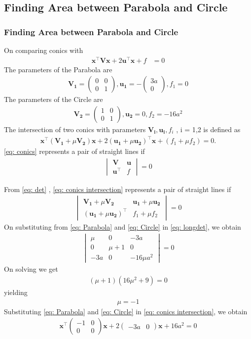 \documentclass{beamer}
\theoremstyle{remark}
\newcommand{\myvec}[1]{\ensuremath{\begin{pmatrix}#1\end{pmatrix}}}
\newcommand{\mydet}[1]{\ensuremath{\begin{vmatrix}#1\end{vmatrix}}}
\let\vec\mathbf
\numberwithin{equation}{section}
\begin{document}
\subsection{Finding Area between Parabola and Circle}
\begin{frame}
\frametitle{Finding Area between Parabola and Circle}
On comparing conics with 
\begin{align}
\vec{x}^\top\vec{V}\vec{x} + 2\vec{u}^\top\vec{x} + f &= 0 \label{eq: conics}
\end{align}
The parameters of the Parabola are 
\begin{align}
\vec{V_1}=\myvec{0&0\\0&1} , \vec{u_1}=-\myvec{3a\\0} , f_1=0 \label{eq: Parabola}
\end{align}
The parameters of the Circle are
\begin{align}
\vec{V_2}=\myvec{1&0\\0&1},\vec{u_2}=0,f_2=-16a^2  \label{eq: Circle}
\end{align}
The intersection of two conics with parameters $\vec{V_i},\vec{u_i},f_i$ , i = 1,2 is defined as
\begin{align}
\vec{x}^\top(\vec{V_1} + \mu\vec{V_2})\vec{x} + 2(\vec{u_1} + \mu\vec{u_2})^\top\vec{x} + (f_1 +\mu f_2) = 0. \label{eq: conics intersection}
\end{align}
\eqref{eq: conics} represents a pair of straight lines if 
\begin{align}
\mydet{\vec{V}&\vec{u}\\\vec{u}^\top&f} = 0  \label{eq: det}
\end{align}
\end{frame}
\begin{frame}
From \eqref{eq: det} , \eqref{eq: conics intersection} represents a pair of straight lines if
\begin{align}
\mydet{\vec{V_1} + \mu\vec{V_2}&\vec{u_1} + \mu\vec{u_2}\\
       (\vec{u_1} + \mu\vec{u_2})^\top&f_1 + \mu f_2} = 0  \label{eq: longdet}
\end{align}
On substituting from \eqref{eq: Parabola} and \eqref{eq: Circle} in \eqref{eq: longdet}, we obtain
\begin{align}
\mydet{\mu&0&-3a\\
       0&\mu+1&0\\
       -3a&0&-16\mu a^2} = 0
\end{align}
On solving we get
\begin{align}
(\mu + 1)(16 \mu^2 + 9) = 0
\end{align}
yielding
\begin{align}
\mu = -1
\end{align}
Substituting \eqref{eq: Parabola} and \eqref{eq: Circle} in \eqref{eq: conics intersection}, we obtain
\begin{align}
\vec{x}^\top\myvec{-1&0\\0&0}\vec{x} + 2\myvec{-3a&0}\vec{x} + 16a^2 = 0
\end{align}
\end{frame}
\end{document}
